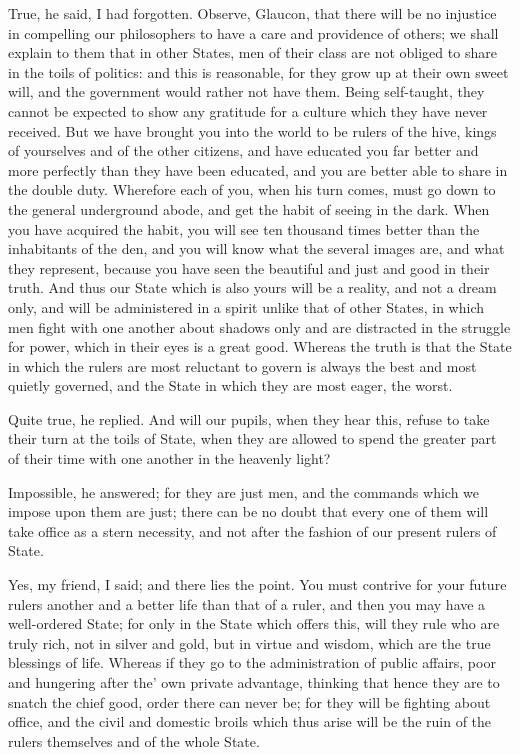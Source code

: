 True, he said, I had forgotten.
Observe, Glaucon, that there will be no injustice in compelling our philosophers to have a care and providence of others; we shall explain to them that in other States, men of their class are not obliged to share in the toils of politics: and this is reasonable, for they grow up at their own sweet will, and the government would rather not have them. Being self-taught, they cannot be expected to show any gratitude for a culture which they have never received. But we have brought you into the world to be rulers of the hive, kings of yourselves and of the other citizens, and have educated you far better and more perfectly than they have been educated, and you are better able to share in the double duty. Wherefore each of you, when his turn comes, must go down to the general underground abode, and get the habit of seeing in the dark. When you have acquired the habit, you will see ten thousand times better than the inhabitants of the den, and you will know what the several images are, and what they represent, because you have seen the beautiful and just and good in their truth. And thus our State which is also yours will be a reality, and not a dream only, and will be administered in a spirit unlike that of other States, in which men fight with one another about shadows only and are distracted in the struggle for power, which in their eyes is a great good. Whereas the truth is that the State in which the rulers are most reluctant to govern is always the best and most quietly governed, and the State in which they are most eager, the worst.

Quite true, he replied.
And will our pupils, when they hear this, refuse to take their turn at the toils of State, when they are allowed to spend the greater part of their time with one another in the heavenly light?

Impossible, he answered; for they are just men, and the commands which we impose upon them are just; there can be no doubt that every one of them will take office as a stern necessity, and not after the fashion of our present rulers of State.

Yes, my friend, I said; and there lies the point. You must contrive for your future rulers another and a better life than that of a ruler, and then you may have a well-ordered State; for only in the State which offers this, will they rule who are truly rich, not in silver and gold, but in virtue and wisdom, which are the true blessings of life. Whereas if they go to the administration of public affairs, poor and hungering after the' own private advantage, thinking that hence they are to snatch the chief good, order there can never be; for they will be fighting about office, and the civil and domestic broils which thus arise will be the ruin of the rulers themselves and of the whole State.

